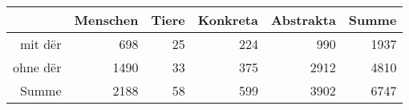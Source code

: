 \begin{tabular}{rrrrrr}
  \hline
 & Menschen & Tiere & Konkreta & Abstrakta & Summe \\ 
  \hline
mit dër & 698 & 25 & 224 & 990 & 1937 \\ 
  ohne dër & 1490 & 33 & 375 & 2912 & 4810 \\ 
  Summe & 2188 & 58 & 599 & 3902 & 6747 \\ 
   \hline
\end{tabular}
